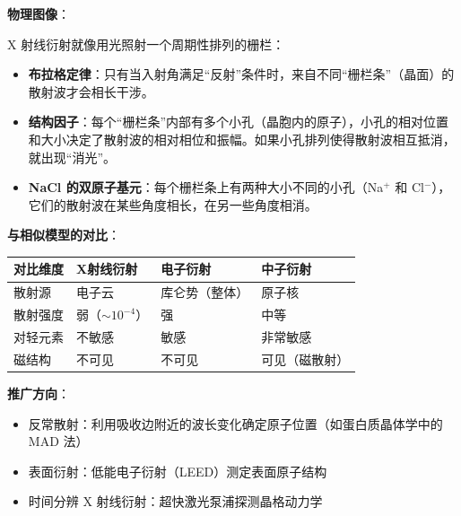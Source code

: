 \begin{insightbox}[物理图像与模型关联]
\textbf{物理图像}：

X 射线衍射就像用光照射一个周期性排列的栅栏：
\begin{itemize}[nosep]
    \item \textbf{布拉格定律}：只有当入射角满足``反射''条件时，来自不同``栅栏条''（晶面）的散射波才会相长干涉。
    \item \textbf{结构因子}：每个``栅栏条''内部有多个小孔（晶胞内的原子），小孔的相对位置和大小决定了散射波的相对相位和振幅。如果小孔排列使得散射波相互抵消，就出现``消光''。
    \item \textbf{NaCl 的双原子基元}：每个栅栏条上有两种大小不同的小孔（Na$^+$ 和 Cl$^-$），它们的散射波在某些角度相长，在另一些角度相消。
\end{itemize}

\textbf{与相似模型的对比}：
\begin{center}
\begin{tabular}{llll}
\toprule
\textbf{对比维度} & \textbf{X射线衍射} & \textbf{电子衍射} & \textbf{中子衍射} \\
\midrule
散射源 & 电子云 & 库仑势（整体） & 原子核 \\
散射强度 & 弱（$\sim10^{-4}$） & 强 & 中等 \\
对轻元素 & 不敏感 & 敏感 & 非常敏感 \\
磁结构 & 不可见 & 不可见 & 可见（磁散射） \\
\bottomrule
\end{tabular}
\end{center}

\textbf{推广方向}：
\begin{itemize}[nosep]
    \item 反常散射：利用吸收边附近的波长变化确定原子位置（如蛋白质晶体学中的 MAD 法）
    \item 表面衍射：低能电子衍射（LEED）测定表面原子结构
    \item 时间分辨 X 射线衍射：超快激光泵浦探测晶格动力学
\end{itemize}
\end{insightbox}

